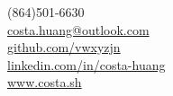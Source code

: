 \documentclass[margin,line]{resume}
\begin{document}
{
	\sc
    \hfill (864)501-6630                  \vspace{0mm}\\\vspace{0mm}%
    \hfill \href{mailto:costa.huang@outlook.com}{costa.huang@outlook.com}           \vspace{0mm}\\\vspace{0mm}%
    \hfill \href{https://github.com/vwxyzjn}{github.com/vwxyzjn}           \vspace{0mm}\\\vspace{0mm}%
    \hfill \href{http://linkedin.com/in/costa-huang}{linkedin.com/in/costa-huang}           \vspace{0mm}\\\vspace{0mm}%
    \hfill \href{https://costa.sh/}{www.costa.sh}               \vspace{0mm}\\\vspace{-10mm}%
}
\end{document}
